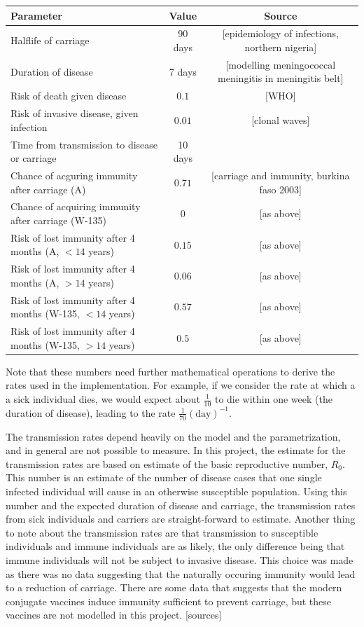 \documentclass[10pt,a4paper]{article}
\begin{document}
\begin{tabular}{|l|c|c|}
	\hline
		Parameter 													& Value			& Source 														\\ \hline
		Halflife of carriage										& 90 days		& [epidemiology of infections, northern nigeria]				\\
		Duration of disease											& 7 days		& [modelling meningococcal meningitis in meningitis belt]		\\
		Risk of death given disease									& $0.1$			& [WHO]															\\
		Risk of invasive disease, given infection					& $0.01$		& [clonal waves]												\\
		Time from transmission to disease or carriage				& 10 days		&																\\
		Chance of acguring immunity after carriage (A)				& $0.71$		& [carriage and immunity, burkina faso 2003]					\\
		Chance of acquiring immunity after carriage (W-135)		& $0$			& [as above]													\\
		Risk of lost immunity after 4 months (A, $<14$ years)		& $0.15$		& [as above]													\\
		Risk of lost immunity after 4 months (A, $>14$ years)		& $0.06$		& [as above]													\\
		Risk of lost immunity after 4 months (W-135, $<14$ years)	& $0.57$		& [as above]													\\
		Risk of lost immunity after 4 months (W-135, $>14$ years)	& $0.5$			& [as above]													\\ \hline
\end{tabular}

Note that these numbers need further mathematical operations to derive the rates used in the implementation. For example, if we consider the rate at which a a sick individual dies, we would expect about $\frac{1}{10}$ to die within one week (the duration of disease), leading to the rate $\frac{1}{70} \left( \textrm{day} \right)^{-1}$.

The transmission rates depend heavily on the model and the parametrization, and in general are not possible to measure. In this project, the estimate for the transmission rates are based on estimate of the basic reproductive number, $R_0$. This number is an estimate of the number of disease cases that one single infected individual will cause in an otherwise susceptible population. Using this number and the expected duration of disease and carriage, the transmission rates from sick individuals and carriers are straight-forward to estimate. Another thing to note about the transmission rates are that transmission to susceptible individuals and immune individuals are as likely, the only difference being that immune individuals will not be subject to invasive disease. This choice was made as there was no data suggesting that the naturally occuring immunity would lead to a reduction of carriage. There are some data that suggests that the modern conjugate vaccines induce immunity sufficient to prevent carriage, but these vaccines are not modelled in this project. [sources]
\end{document}
